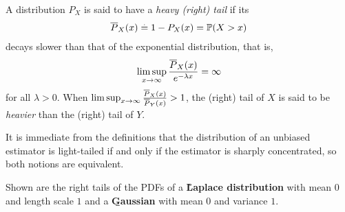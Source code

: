 \begin{defn}
  A distribution $P_X$ is said to have a \emph{heavy (right) tail} if its  \begin{align}
    \mean{P}_X(x) \defeq 1 - P_X(x) = \Pr{X > x}
  \end{align} decays slower than that of the exponential distribution, that is, \begin{align}
    \limsup_{x\to\infty} \frac{\overline{P}_X(x)}{e^{-\lambda x}} = \infty
  \end{align} for all $\lambda > 0$.
  When $\limsup_{x\to\infty} \frac{\overline{P}_X(x)}{\overline{P}_Y(x)} > 1$, the (right) tail of $X$ is said to be \emph{heavier} than the (right) tail of $Y$.
\end{defn}

It is immediate from the definitions that the distribution of an unbiased estimator is light-tailed if and only if the estimator is sharply concentrated, so both notions are equivalent.

\begin{marginfigure}[13\baselineskip]
	\caption{Shown are the right tails of the PDFs of a \textbf{\r{Laplace distribution}} with mean $0$ and length scale $1$ and a \textbf{\b{Gaussian}} with mean $0$ and variance $1$.}
\end{marginfigure}

